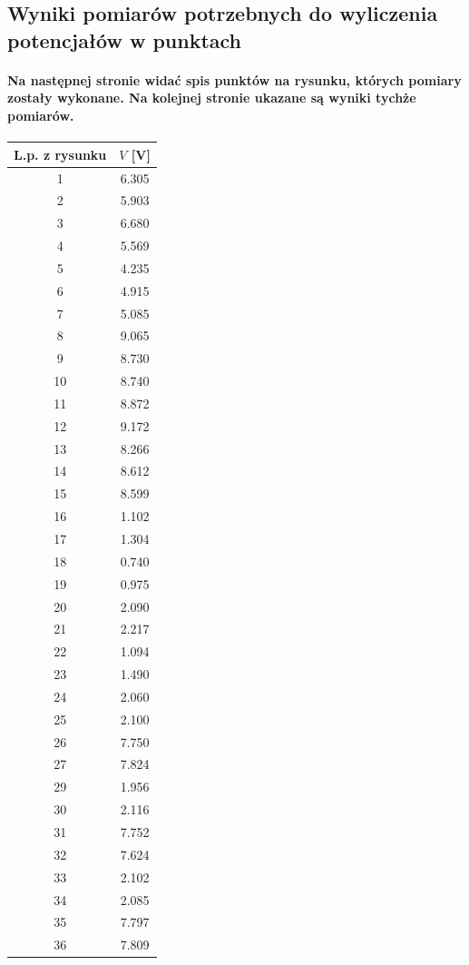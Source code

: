 \documentclass[a4paper,12pt]{article}
\begin{document}
\begin{justify}
\subsection{Wyniki pomiarów potrzebnych do wyliczenia potencjałów w punktach}

\paragraph{Na następnej stronie widać spis punktów na rysunku, których pomiary zostały wykonane. Na kolejnej stronie ukazane są wyniki tychże pomiarów.}



\begin{center}
\begin{tabular}{ |c|c| }
\hline
L.p. z rysunku & $V$ [V] \\
\hline
1 & 6.305 \\
\hline
2 & 5.903 \\
\hline
3 & 6.680 \\
\hline
4 & 5.569 \\
\hline
5 & 4.235 \\
\hline
6 & 4.915 \\
\hline
7 & 5.085 \\
\hline
8 & 9.065 \\
\hline
9 & 8.730 \\
\hline
10 & 8.740 \\
\hline
11 & 8.872 \\
\hline
12 & 9.172 \\
\hline
13 & 8.266 \\
\hline
14 & 8.612 \\
\hline
15 & 8.599 \\
\hline
16 & 1.102 \\
\hline
17 & 1.304 \\
\hline
18 & 0.740 \\
\hline
19 & 0.975 \\
\hline
20 & 2.090 \\
\hline
21 & 2.217 \\
\hline
22 & 1.094 \\
\hline
23 & 1.490 \\
\hline
24 & 2.060 \\
\hline
25 & 2.100 \\
\hline
26 & 7.750 \\
\hline
27 & 7.824 \\
\hline
29 & 1.956  \\
\hline
30 & 2.116  \\
\hline
31 & 7.752  \\
\hline
32 & 7.624  \\
\hline
33 & 2.102  \\
\hline
34 & 2.085  \\
\hline
35 & 7.797  \\
\hline
36 & 7.809  \\
\hline
\end{tabular}
\end{center}


\end{justify}
\end{document}
